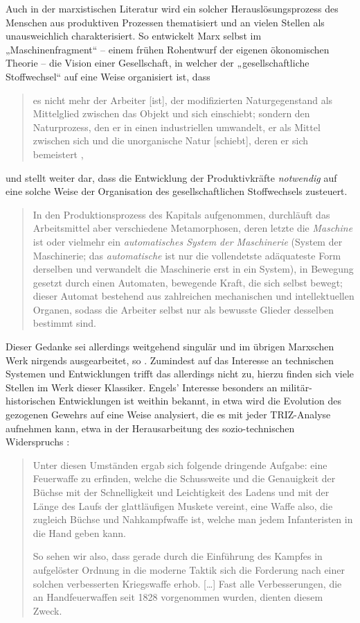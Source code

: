 \documentclass[11pt,a4paper]{article}
\begin{document}
Auch in der marxistischen Literatur wird ein solcher Herauslösungsprozess des
Menschen aus produktiven Prozessen thematisiert und an vielen Stellen als
unausweichlich charakterisiert.  So entwickelt Marx selbst im
„Maschinenfragment“ \cite[S. 570 ff.]{MEW42} -- einem frühen Rohentwurf der
eigenen ökonomischen Theorie -- die Vision einer Gesellschaft, in welcher der
„gesellschaftliche Stoffwechsel“ \cite[S. 37]{MEW23} auf eine Weise
organisiert ist, dass
\begin{quote}
  es nicht mehr der Arbeiter [ist], der modifizierten Naturgegenstand als
  Mittelglied zwischen das Objekt und sich einschiebt; sondern den
  Naturprozess, den er in einen industriellen umwandelt, er als Mittel
  zwischen sich und die unorganische Natur [schiebt], deren er sich
  bemeistert \cite[S. 572]{MEW42},
\end{quote}
und stellt weiter dar, dass die Entwicklung der Produktivkräfte
\emph{notwendig} auf eine solche Weise der Organisation des gesellschaftlichen
Stoffwechsels zusteuert.
\begin{quote}
  In den Produktionsprozess des Kapitals aufgenommen, durchläuft das
  Arbeitsmittel aber verschiedene Metamorphosen, deren letzte die
  \emph{Maschine} ist oder vielmehr ein \emph{automatisches System der
    Maschinerie} (System der Maschinerie; das \emph{automatische} ist nur die
  vollendetste adäquateste Form derselben und verwandelt die Maschinerie erst
  in ein System), in Bewegung gesetzt durch einen Automaten, bewegende Kraft,
  die sich selbst bewegt; dieser Automat bestehend aus zahlreichen mechanischen
  und intellektuellen Organen, sodass die Arbeiter selbst nur als bewusste
  Glieder desselben bestimmt sind. \cite[S. 584]{MEW42}
\end{quote}
Dieser Gedanke sei allerdings weitgehend singulär und im übrigen Marxschen
Werk nirgends ausgearbeitet, so \cite{Goldberg2016}. Zumindest auf das
Interesse an technischen Systemen und Entwicklungen trifft das allerdings
nicht zu, hierzu finden sich viele Stellen im Werk dieser Klassiker. Engels'
Interesse besonders an militär-historischen Entwicklungen ist weithin bekannt,
in \cite{MEW15} etwa wird die Evolution des gezogenen Gewehrs auf eine Weise
analysiert, die es mit jeder TRIZ-Analyse aufnehmen kann, etwa in der
Herausarbeitung des sozio-technischen Widerspruchs \cite[S. 199]{MEW15}:
\begin{quote}
  Unter diesen Umständen ergab sich folgende dringende Aufgabe: eine
  Feuerwaffe zu erfinden, welche die Schussweite und die Genauigkeit der
  Büchse mit der Schnelligkeit und Leichtigkeit des Ladens und mit der Länge
  des Laufs der glattläufigen Muskete vereint, eine Waffe also, die zugleich
  Büchse und Nahkampfwaffe ist, welche man jedem Infanteristen in die Hand
  geben kann.

  So sehen wir also, dass gerade durch die Einführung des Kampfes in
  aufgelöster Ordnung in die moderne Taktik sich die Forderung nach einer
  solchen verbesserten Kriegswaffe erhob. [\ldots] Fast alle Verbesserungen,
  die an Handfeuerwaffen seit 1828 vorgenommen wurden, dienten diesem Zweck.
\end{quote}
\end{document}
